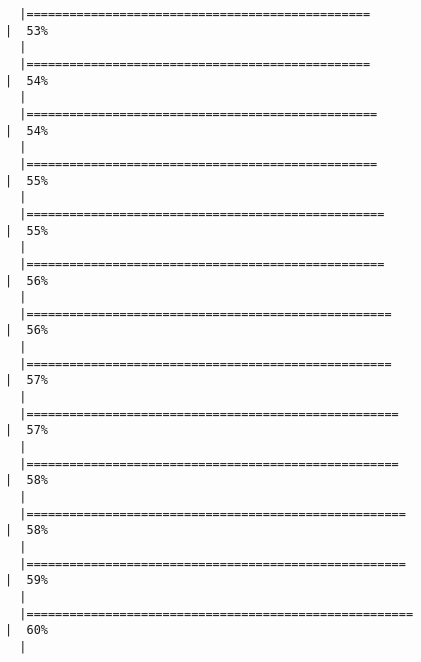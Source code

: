 \documentclass[12pt]{article}
\begin{document}
\begin{verbatim}
  |================================================                                          |  53%
  |                                                                                                
  |================================================                                          |  54%
  |                                                                                                
  |=================================================                                         |  54%
  |                                                                                                
  |=================================================                                         |  55%
  |                                                                                                
  |==================================================                                        |  55%
  |                                                                                                
  |==================================================                                        |  56%
  |                                                                                                
  |===================================================                                       |  56%
  |                                                                                                
  |===================================================                                       |  57%
  |                                                                                                
  |====================================================                                      |  57%
  |                                                                                                
  |====================================================                                      |  58%
  |                                                                                                
  |=====================================================                                     |  58%
  |                                                                                                
  |=====================================================                                     |  59%
  |                                                                                                
  |======================================================                                    |  60%
  |                                                                                                

\end{verbatim}
\end{document}
